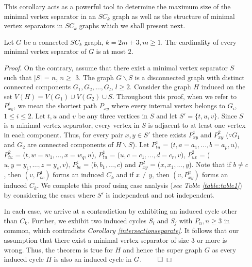 \documentclass[runningheads]{llncs}
\begin{document}
This corollary acts as a powerful tool to determine the maximum size of the minimal vertex separator in an $SC_k$ graph as well as the structure of minimal vertex separators in $SC_k$ graphs which we shall present next.                                                                                                                                                                                 
                                                                                                                                                                                 
\begin{theorem}
\label{mvssc2k+1}
 Let $G$ be a connected $SC_{k}$ graph, $k = 2m+3, m \geq 1$. The cardinality of every minimal vertex separator of $G$ is at most 2.
\end{theorem}
\begin{proof} On the contrary, assume that there exist a minimal vertex separator $S$ such that $\vert S \vert$ = $n$, $n \geq$ 3. The graph $G\backslash S$ is a disconnected graph with distinct connected components $G_1, G_2, \ldots, G_l$, $l \geq 2$. 
Consider the graph $H$ induced on the set $V(H) = V(G_1) \cup V(G_2) \cup S$. Throughout this proof, when we refer to $P_{xy}^i$, we mean the shortest path $P_{xy}$ where every internal vertex belongs to $G_i$, $1 \leq i \leq 2$. Let $t, u$ and $v$ be any three vertices in $S$ and let $S' = \{t, u, v\}$. Since $S$ is a minimal vertex separator, every vertex in $S$ is adjacent to at least one vertex in each component. Thus, for every pair $x, y \in S'$ there exists $P_{xy}^1$ and $P_{xy}^2$ ($\because G_1$ and $G_2$ are connected components of $H \backslash S$). Let $P_{tu}^{1}$ = ($t, a=a_1, \ldots, b=a_p, u$), $P_{tu}^2$ = ($t, w=w_1, \ldots, x=w_q, u$), $P_{tu}^{1}$ = ($u, c=c_1, \ldots, d=c_{r}, v$), $P_{uv}^2$ = ($u, y=y_1, \ldots, z=y_{s}, v$), $P_{bc}^{1}$ = ($b, b_1, \ldots, c$) and $P_{xy}^{2}$ = ($x, x_1, \ldots, y$). Note that if $b\neq c$, then $(v,P_{bc}^{1})$ forms an induced $C_k$ and if $x \neq y$, then $(v,P_{xy}^{2})$ forms an induced $C_k$. We complete this proof using case analysis (\emph{see Table \ref{table:table1}}) by considering the cases where $S'$ is independent and not independent.

In each case, we arrive at a contradiction by exhibiting an induced cycle other than $C_k$. Further, we exhibit two induced cycles $S_i$ and $S_j$ with $P_n, n \geq 3$ in common, which contradicts \emph{Corollary \ref{intersectionseparate}}. It follows that our assumption that there exist a minimal vertex separator of size 3 or more is wrong. Thus, the theorem is true for $H$ and hence the super graph $G$ as every induced cycle $H$ is also an induced cycle in $G$. $\hfill \qed$
\end{proof}
\end{document}
